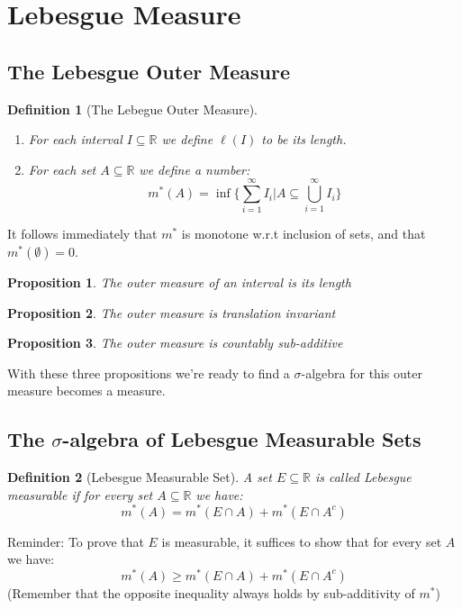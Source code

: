 \documentclass[11pt]{article}
\newtheorem*{definition*}{Definition}
\newtheorem*{proposition*}{Proposition}
\begin{document}
\section[2]{Lebesgue Measure}
\subsection[2.2]{The Lebesgue Outer Measure}
\begin{definition*}[The Lebegue Outer Measure]
    \begin{enumerate}
        \item For each interval $I \subseteq \mathbb{R}$ we define $\ell(I)$ to be its length.
        \item For each set $A \subseteq \mathbb{R}$ we define a number:
              \[
                  m^*(A) = \inf \bigg\{\sum_{i=1}^{\infty} I_i \bigg| A \subseteq \bigcup_{i=1}^\infty I_i  \bigg\}
              \]
    \end{enumerate}
\end{definition*}
It follows immediately that $m^*$ is monotone w.r.t inclusion of sets, and that $m^*(\emptyset) = 0$.

\begin{proposition*}
    The outer measure of an interval is its length
\end{proposition*}
\begin{proposition*}
    The outer measure is translation invariant
\end{proposition*}
\begin{proposition*}
    The outer measure is countably sub-additive
\end{proposition*}
With these three propositions we're ready to find a $\sigma$-algebra for this outer measure becomes a measure.
\subsection[2.3]{The $\sigma$-algebra of Lebesgue Measurable Sets}
\begin{definition*}[Lebesgue Measurable Set]
    A set $E \subseteq \mathbb{R}$ is called Lebesgue measurable if for every set $A \subseteq \mathbb{R}$ we have:
    \[
        m^*(A) = m^*(E \cap A) + m^*(E \cap A^c)
    \]
\end{definition*}

Reminder: To prove that $E$ is measurable, it suffices to show that for every set $A$ we have:
\[
    m^*(A) \geq m^*(E \cap A) + m^*(E \cap A^c)
\]
(Remember that the opposite inequality always holds by sub-additivity of $m^*$)
\end{document}
